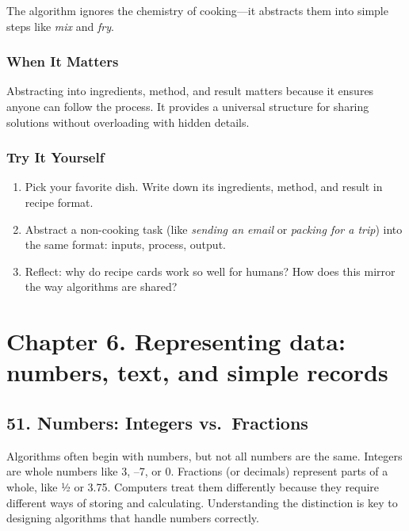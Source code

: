 \documentclass[
  letterpaper,
  DIV=11,
  numbers=noendperiod]{scrreprt}
\providecommand{\tightlist}{%
  \setlength{\itemsep}{0pt}\setlength{\parskip}{0pt}}
\begin{document}
The algorithm ignores the chemistry of cooking---it abstracts them into
simple steps like \emph{mix} and \emph{fry}.

\subsubsection{When It Matters}\label{when-it-matters-47}

Abstracting into ingredients, method, and result matters because it
ensures anyone can follow the process. It provides a universal structure
for sharing solutions without overloading with hidden details.

\subsubsection{Try It Yourself}\label{try-it-yourself-49}

\begin{enumerate}
\def\labelenumi{\arabic{enumi}.}
\tightlist
\item
  Pick your favorite dish. Write down its ingredients, method, and
  result in recipe format.
\item
  Abstract a non-cooking task (like \emph{sending an email} or
  \emph{packing for a trip}) into the same format: inputs, process,
  output.
\item
  Reflect: why do recipe cards work so well for humans? How does this
  mirror the way algorithms are shared?
\end{enumerate}

\section{Chapter 6. Representing data: numbers, text, and simple
records}\label{chapter-6.-representing-data-numbers-text-and-simple-records}

\subsection{51. Numbers: Integers
vs.~Fractions}\label{numbers-integers-vs.-fractions}

Algorithms often begin with numbers, but not all numbers are the same.
Integers are whole numbers like 3, --7, or 0. Fractions (or decimals)
represent parts of a whole, like ½ or 3.75. Computers treat them
differently because they require different ways of storing and
calculating. Understanding the distinction is key to designing
algorithms that handle numbers correctly.
\end{document}
